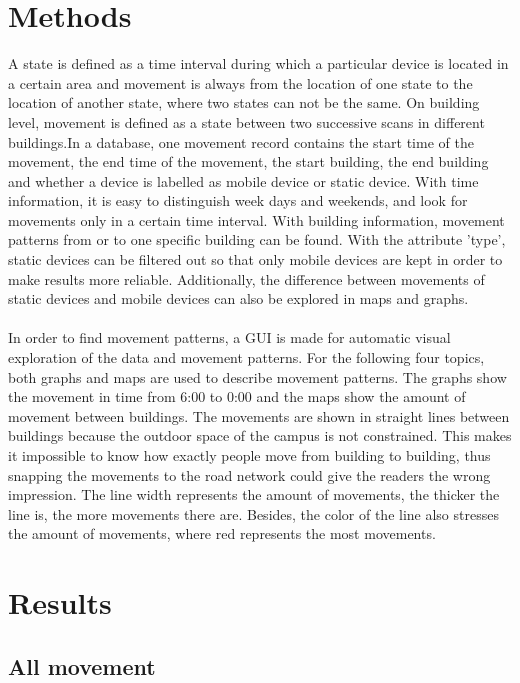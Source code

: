 \section{Methods}\label{chapter9methods}
A state is defined as a time interval during which a particular device is located in a certain area and movement is always from the location of one state to the location of another state, where two states can not be the same. On building level, movement is defined as a state between two successive scans in different buildings.In a database, one movement record contains the start time of the movement, the end time of the movement, the start building, the end building and whether a device is labelled as mobile device or static device. With time information, it is easy to distinguish week days and weekends, and look for movements only in a certain time interval. With building information, movement patterns from or to one specific building can be found. With the attribute 'type', static devices can be filtered out so that only mobile devices are kept in order to make results more reliable. Additionally, the difference between movements of static devices and mobile devices can also be explored in maps and graphs.
\\\\
In order to find movement patterns, a GUI is made for automatic visual exploration of the data and movement patterns. For the following four topics, both graphs and maps are used to describe movement patterns. The graphs show the movement in time from 6:00 to 0:00 and the maps show the amount of movement between buildings. The movements are shown in straight lines between buildings because the outdoor space of the campus is not constrained. This makes it impossible to know how exactly people move from building to building, thus snapping the movements to the road network could give the readers the wrong impression. The line width represents the amount of movements, the thicker the line is, the more movements there are. Besides, the color of the line also stresses the amount of movements, where red represents the most movements.

\section{Results}\label{chapter9results}
\subsection{All movement}\label{chapter9Allmovement}

